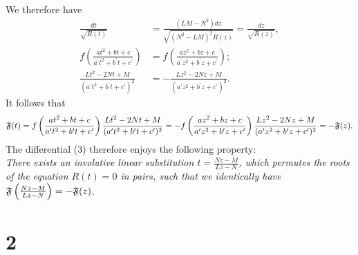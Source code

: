\documentclass[11pt]{article}
\begin{document}
We therefore have
\begin{align*}
\frac{dt}{\sqrt{R(t)}} &= \frac{(LM-N^{2})dz}{\sqrt{(N^{2}-LM)^{2}R(z)}} = \frac{dz}{\sqrt{R(z)}}, \\
f\left(\frac{at^{2}+bt+c}{a^{\prime}t^{2}+b^{\prime}t+c^{\prime}}\right) &= f\left(\frac{az^{2}+bz+c}{a^{\prime}z^{2}+b^{\prime}z+c^{\prime}}\right); \\
\frac{Lt^{2}-2Nt+M}{(a^{\prime}t^{2}+b^{\prime}t+c^{\prime})^2} &= -\frac{Lz^{2}-2Nz+M}{(a^{\prime}z^{2}+b^{\prime}z+c^{\prime})^2}.
\end{align*}
It follows that
\begin{equation*}
\mathfrak{F}(t) = f\left(\frac{at^{2}+bt+c}{a^{\prime}t^{2}+b^{\prime}t+c^{\prime}}\right)\frac{Lt^{2}-2Nt+M}{(a^{\prime}t^{2}+b^{\prime}t+c^{\prime})^{2}} = -f\left(\frac{az^{2}+bz+c}{a^{\prime}z^{2}+b^{\prime}z+c^{\prime}}\right)\frac{Lz^{2}-2Nz+M}{(a^{\prime}z^{2}+b^{\prime}z+c^{\prime})^{2}} = -\mathfrak{F}(z).
\end{equation*}
The differential (3) therefore enjoys the following property: \\

\textit{There exists an involutive linear substitution $t=\frac{Nz-M}{Lz-N}$, which permutes the roots of the equation $R(t)=0$ in pairs, such that we identically have $\mathfrak{F}\left(\frac{Nz-M}{Lz-N}\right)=-\mathfrak{F}(z)$.}

\section*{2}
\end{document}
